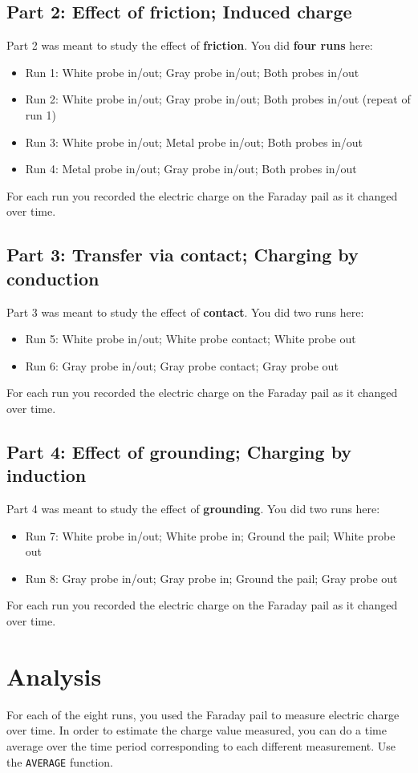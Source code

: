 \subsection{Part 2: Effect of friction; Induced charge}
%
Part 2 was meant to study the effect of \textbf{friction}. You did \textbf{four runs} here:
\begin{itemize}
	\item Run 1: White probe in/out; Gray probe in/out; Both probes in/out
	\item Run 2: White probe in/out; Gray probe in/out; Both probes in/out (repeat of run 1)
	\item Run 3: White probe in/out; Metal probe in/out; Both probes in/out
	\item Run 4: Metal probe in/out; Gray probe in/out; Both probes in/out
\end{itemize}
For each run you recorded the electric charge on the Faraday pail as it changed over time.
%
\subsection{Part 3: Transfer via contact; Charging by conduction}
%
Part 3 was meant to study the effect of \textbf{contact}. You did two runs here:
\begin{itemize}
	\item Run 5: White probe in/out; White probe contact; White probe out
	\item Run 6: Gray probe in/out; Gray probe contact; Gray probe out
\end{itemize}
For each run you recorded the electric charge on the Faraday pail as it changed over time.
%
\subsection{Part 4: Effect of grounding; Charging by induction}
%
Part 4 was meant to study the effect of \textbf{grounding}. You did two runs here:
\begin{itemize}
	\item Run 7: White probe in/out; White probe in; Ground the pail; White probe out
	\item Run 8: Gray probe in/out; Gray probe in; Ground the pail; Gray probe out
\end{itemize}
For each run you recorded the electric charge on the Faraday pail as it changed over time.
%
\section{Analysis}
%
For each of the eight runs, you used the Faraday pail to measure electric charge over time. In order to estimate the charge value measured, you can do a time average over the time period corresponding to each different measurement. Use the \texttt{AVERAGE} function.
%

